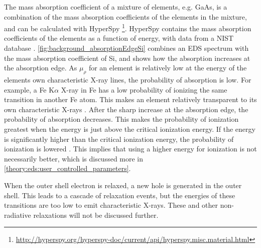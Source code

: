The mass absorption coefficient of a mixture of elements, e.g. GaAs, is a combination of the mass absorption coefficients of the elements in the mixture, and can be calculated with HyperSpy \cite{hyperspy_1.7.1}\footnote{\url{http://hyperspy.org/hyperspy-doc/current/api/hyperspy.misc.material.html}}.
HyperSpy contains the mass absorption coefficients of the elements as a function of energy, with data from a NIST database \cite{nist_xraydatabase_hyperspy}.
\cref{fig:background_absorptionEdgeSi} combines an EDS spectrum with the mass absorption coefficient of Si, and shows how the absorption increases at the absorption edge.
As $\mu_\rho$ for an element is relatively low at the energy of the elements own characteristic X-ray lines, the probability of absorption is low.
For example, a Fe K$\alpha$ X-ray in Fe has a low probability of ionizing the same transition in another Fe atom.
This makes an element relatively transparent to its own characteristic X-rays \cite[Ch. 4.4]{goldstein_scanning_2018}.
After the sharp increase at the absorption edge, the probability of absorption decreases.
This makes the probability of ionization greatest when the energy is just above the critical ionization energy.
If the energy is significantly higher than the critical ionization energy, the probability of ionization is lowered \cite[p. 78]{curry_radiology_k_absorption}. %
This implies that using a higher energy for ionization is not necessarily better, which is discussed more in \cref{theory:eds:user_controlled_parameters}.


When the outer shell electron is relaxed, a new hole is generated in the outer shell.
This leads to a cascade of relaxation events, but the energies of these transitions are too low to emit characteristic X-rays.
These and other non-radiative relaxations will not be discussed further.



